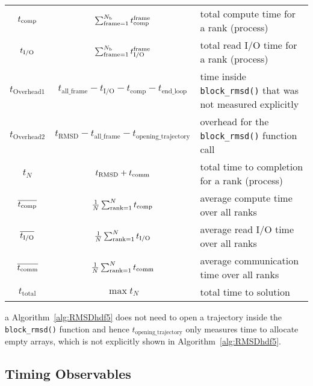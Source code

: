 \begin{table}[!htb]
\begin{threeparttable}
\begin{tabular}{cccp{}}
    ${t}_{\text{comp}}$ & \multicolumn{2}{c}{$\sum_{\text{frame}=1}^{N_{\text{b}}}{t}_{\text{comp}}^{\text{frame}}$} & total compute time for a rank (process)\\
    ${t}_{\text{I/O}}$ & \multicolumn{2}{c}{$\sum_{\text{frame}=1}^{N_{\text{b}}}{t}_{\text{I/O}}^{\text{frame}}$} & total read I/O time for a rank (process)\\  
    $t_{\text{Overhead1}}$ & \multicolumn{2}{c}{$t_{\text{all\_frame}}-t_{\text{I/O}}-t_{\text{comp}}-t_{\text{end\_loop}}$}  & time inside \texttt{block\_rmsd()} that was not measured explicitly\\
    $t_{\text{Overhead2}}$ & \multicolumn{2}{c}{$t_{\text{RMSD}}-t_{\text{all\_frame}}-t_{\text{opening\_trajectory}}$} & overhead for the \texttt{block\_rmsd()} function call\\
    $t_{N}$ & \multicolumn{2}{c}{$t_{\text{RMSD}}+t_{\text{comm}}$} & total time to completion for a rank (process)\\
    \toprule
    $\overline{{t}_{\text{comp}}}$ & \multicolumn{2}{c}{$\frac{1}{N}\sum_{\text{rank}=1}^{N} {t}_{\text{comp}}$} & average compute time over all ranks\\
    $\overline{{t}_{\text{I/O}}}$ & \multicolumn{2}{c}{$\frac{1}{N}\sum_{\text{rank}=1}^{N} {t}_{\text{I/O}}$} & average read I/O time over all ranks\\
    $\overline{t_{\text{comm}}}$ & \multicolumn{2}{c}{$\frac{1}{N}\sum_{\text{rank}=1}^{N} t_{\text{comm}}$} & average communication time over all ranks\\
    $t_{\text{total}}$ & \multicolumn{2}{c}{$\max t_{N}$} & total time to solution\\
    \bottomrule
  \end{tabular}
    \begin{tablenotes}
    \item [a] Algorithm~\ref{alg:RMSDhdf5} does not need to open a trajectory inside the \texttt{block\_rmsd()} function and hence $t_{\text{opening\_trajectory}}$ only measures time to allocate empty arrays, which is not explicitly shown in Algorithm~\ref{alg:RMSDhdf5}.
      \end{tablenotes}
\end{threeparttable}
\end{table}


\subsection{Timing Observables}

